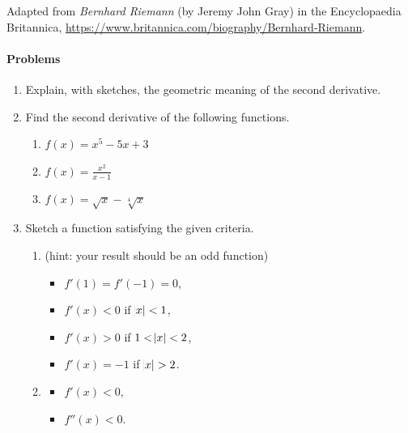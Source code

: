 \begin{flushright}
  Adapted from \textit{Bernhard Riemann} (by Jeremy John Gray) in the Encyclopaedia Britannica, \url{https://www.britannica.com/biography/Bernhard-Riemann}.
\end{flushright}

\paragraph{Problems}
\begin{enumerate}
  \item Explain, with sketches, the geometric meaning of the second derivative.
  \item Find the second derivative of the following functions.
    \begin{enumerate}
      \item $ f(x) = x^5 - 5x + 3 $
      \item $ f(x) = \frac{x^2}{x - 1} $
      \item $ f(x) = \sqrt{x} - \sqrt[4]{x} $
    \end{enumerate}
  \item Sketch a function satisfying the given criteria.
    \begin{enumerate}
      \item (hint: your result should be an odd function)
        \begin{itemize}
           \item $ f'(1) = f'(-1) = 0 $,
           \item $ f'(x) < 0 $ if $ \abs{x} < 1 $,
           \item $ f'(x) > 0 $ if $ 1 < \abs{x} < 2 $,
           \item $ f'(x) = -1 $ if $ \abs{x} > 2 $.
        \end{itemize}
      \item
        \begin{itemize}
          \item $ f'(x) < 0 $,
          \item $ f''(x) < 0 $.
        \end{itemize}
    \end{enumerate}
\end{enumerate}
